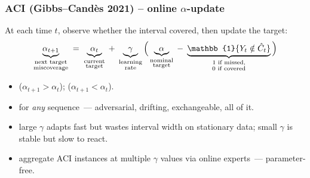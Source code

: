 \documentclass[11pt, aspectratio=169, xcolor={dvipsnames}, usepdftitle=false]{beamer}
\begin{document}
\begin{frame}
\frametitle{ACI (Gibbs--Cand\`es 2021) -- online $\alpha$-update}
At each time $t$, observe whether the interval covered, then update the target:
\begin{equation*}
\underbrace{\alpha_{t+1}}_{\substack{\text{next target}\\\text{miscoverage}}}
\;=\;
\underbrace{\alpha_t}_{\substack{\text{current}\\\text{target}}}
\;+\;
\underbrace{\gamma}_{\substack{\text{learning}\\\text{rate}}}
\,\Bigl(\,
\underbrace{\alpha}_{\substack{\text{nominal}\\\text{target}}}
\;-\;
\underbrace{\mathbb{1}\{Y_t \notin \hat{C}_t\}}_{\substack{\text{1 if missed,}\\\text{0 if covered}}}
\,\Bigr)
\end{equation*}
\begin{itemize}
\item {} ($\alpha_{t+1} > \alpha_t$);  ($\alpha_{t+1} < \alpha_t$).
\item {} for \emph{any} sequence~--- adversarial, drifting, exchangeable, all of it.
\item {} large $\gamma$ adapts fast but wastes interval width on stationary data; small $\gamma$ is stable but slow to react.
\item {} aggregate ACI instances at multiple $\gamma$ values via online experts~--- parameter-free.
\end{itemize}
\end{frame}
\end{document}
